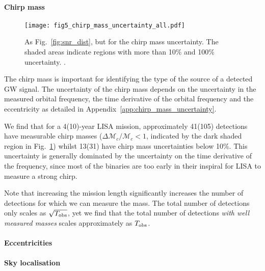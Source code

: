 \paragraph{Chirp mass}

\begin{figure}[tb]
    \centering
    \texttt{[image: fig5\_chirp\_mass\_uncertainty\_all.pdf]}
    \caption{As Fig.~\ref{fig:snr_dist}, but for the chirp mass uncertainty. The shaded areas indicate regions with more than 10\% and 100\% uncertainty. \href{https://github.com/TomWagg/detecting-DCOs-in-LISA/blob/main/paper/figures/fig5_chirp_mass_uncertainty_all.pdf}{\faFileImage} \href{https://github.com/TomWagg/detecting-DCOs-in-LISA/blob/main/paper/figure_notebooks/fiducial.ipynb}{\faBook}.}
    \label{fig:m_c_unc}
\end{figure}

The chirp mass is important for identifying the type of the source of a detected GW signal. The uncertainty of the chirp mass depends on the uncertainty in the measured orbital frequency, the time derivative of the orbital frequency and the eccentricity as detailed in Appendix~\ref{app:chirp_mass_uncertainty}.

We find that for a 4(10)-year LISA mission, approximately 41(105) detections have measurable chirp masses ($\Delta \mathcal{M}_c / \mathcal{M}_c < 1$, indicated by the dark shaded region in Fig.~\ref{fig:m_c_unc}) whilst 13(31) have chirp mass uncertainties below 10\%. This uncertainty is generally dominated by the uncertainty on the time derivative of the frequency, since most of the binaries are too early in their inspiral for LISA to measure a strong chirp.

Note that increasing the mission length significantly increases the number of detections for which we can measure the mass. The total number of detections only scales as $\sqrt{T_{\rm obs}}$, yet we find that the total number of detections \textit{with well measured masses} scales approximately as $T_{\rm obs}$.

\paragraph{Eccentricities}


\paragraph{Sky localisation}

